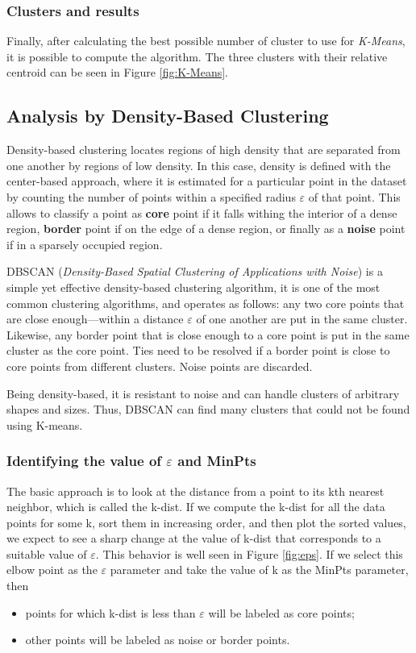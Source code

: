 \documentclass[a4paper,11pt,dvipsnames]{article}
\begin{document}
\subsubsection{Clusters and results}
Finally, after calculating the best possible number of cluster to use for \textit{K-Means}, it is possible to compute the algorithm. The three clusters with their relative centroid can be seen in Figure \ref{fig:K-Means}.

\subsection{Analysis by Density-Based Clustering}
Density-based clustering locates regions of high density that are separated from one another by regions of low density. In this case, density is defined with the center-based approach, where it is estimated for a particular point in the dataset by counting the number of points within a specified radius $\varepsilon$ of that point. This allows to classify a point as \textbf{core} point if it falls withing the interior of a dense region, \textbf{border} point if on the edge of a dense region, or finally as a \textbf{noise} point if in a sparsely occupied region.

DBSCAN (\textit{Density-Based Spatial Clustering of Applications with Noise}) is a simple yet effective density-based clustering algorithm, it is one of the most common clustering algorithms, and operates as follows: any two core points that are close enough—within a distance $\varepsilon$ of one another are put in the same cluster. Likewise, any border point that is close enough to a core point is put in the same cluster as the core point. Ties need to be resolved if a border point is close to core points from different clusters. Noise points are discarded.

Being density-based, it is resistant to noise and can handle clusters of arbitrary shapes and sizes. Thus, DBSCAN can find many clusters that could not be found using K-means.

\subsubsection{Identifying the value of $\varepsilon$ and MinPts}
The basic approach is to look at the distance from a point to its kth nearest neighbor, which is called the k-dist. If we compute the k-dist for all the data points for some k, sort them in increasing order, and then plot the sorted values, we expect to see a sharp change at the value of k-dist that corresponds to a suitable value of $\varepsilon$. This behavior is well seen in Figure \ref{fig:eps}. If we select this elbow point as the $\varepsilon$ parameter and take the value of k as the MinPts parameter, then 
\begin{itemize}
    \item points for which k-dist is less than $\varepsilon$ will be labeled as core points;
    \item  other points will be labeled as noise or border points.
\end{itemize}
\end{document}
